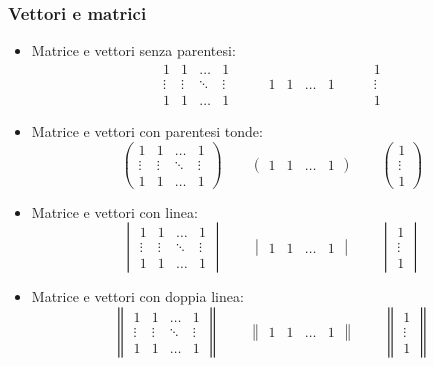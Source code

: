 \documentclass[a4paper, 12pt]{book}
\theoremstyle{plain}
\begin{document}
	\subsubsection{Vettori e matrici}
	\begin{itemize}
		\item Matrice e vettori senza parentesi:
		\[
		\begin{matrix}
			1 & 1 & \dots & 1\\
			\vdots & \vdots & \ddots & \vdots\\
			1 & 1 & \dots & 1
		\end{matrix} \qquad \begin{matrix}
			1 & 1 & \dots & 1
		\end{matrix} \qquad \begin{matrix}
			1\\
			\vdots\\
			1
		\end{matrix}
		\]
		\item Matrice e vettori con parentesi tonde:
		\[
		\begin{pmatrix}
			1 & 1 & \dots & 1\\
			\vdots & \vdots & \ddots & \vdots\\
			1 & 1 & \dots & 1
		\end{pmatrix} \qquad \begin{pmatrix}
			1 & 1 & \dots & 1
		\end{pmatrix} \qquad \begin{pmatrix}
			1\\
			\vdots\\
			1
		\end{pmatrix}
		\]
		\item Matrice e vettori con linea:
		\[
		\begin{vmatrix}
			1 & 1 & \dots & 1\\
			\vdots & \vdots & \ddots & \vdots\\
			1 & 1 & \dots & 1
		\end{vmatrix} \qquad \begin{vmatrix}
			1 & 1 & \dots & 1
		\end{vmatrix} \qquad \begin{vmatrix}
			1\\
			\vdots\\
			1
		\end{vmatrix}
		\]
		\item Matrice e vettori con doppia linea:
		\[
		\begin{Vmatrix}
			1 & 1 & \dots & 1\\
			\vdots & \vdots & \ddots & \vdots\\
			1 & 1 & \dots & 1
		\end{Vmatrix} \qquad \begin{Vmatrix}
			1 & 1 & \dots & 1
		\end{Vmatrix} \qquad \begin{Vmatrix}
			1\\
			\vdots\\
			1
		\end{Vmatrix}
		\]
	\end{itemize}
\end{document}
